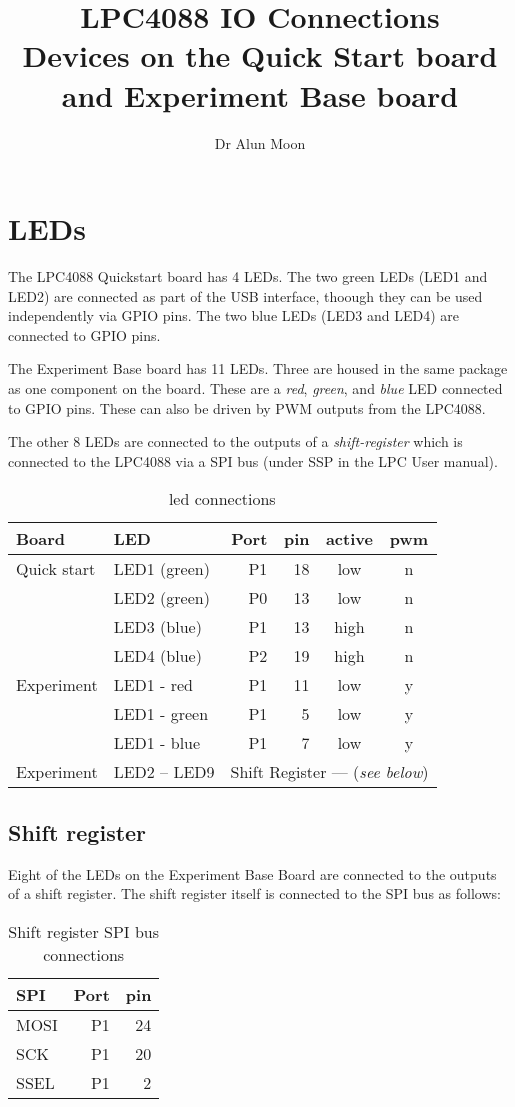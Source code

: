 \documentclass[12pt]{tufte-handout}
\title{LPC4088 IO Connections\\Devices on the Quick Start board and
  Experiment Base board}
\author{Dr Alun Moon}
\begin{document}
\maketitle

\section{LEDs}
The LPC4088 Quickstart board has 4 LEDs.  The two green LEDs (LED1 and
LED2) are connected as part of the USB interface, thoough they can be
used independently via GPIO pins.  The two blue LEDs (LED3 and LED4)
are connected to GPIO pins.

The Experiment Base board has 11 LEDs.  Three are housed in the same
package as one component on the board.  These are a \emph{red},
\emph{green}, and \emph{blue} LED connected to GPIO pins.  These can also
be driven by PWM outputs from the LPC4088.  

The other 8 LEDs are connected to the outputs of a
\emph{shift-register} which is connected to the LPC4088 via a SPI bus
(under SSP in the LPC User manual).
\begin{table}
\begin{tabular}{llrrcc}
  Board & LED & Port & pin & active & pwm \\
  \midrule[1pt]
  Quick start & {LED1} (green) & P1 & 18 & low  & n \\
              & {LED2} (green) & P0 & 13 & low & n \\
              & {LED3} (blue)  & P1 & 13 & high & n \\
              & {LED4} (blue)  & P2 & 19 & high & n \\
 \midrule
  Experiment  & {LED1 - red}   & P1 & 11 & low & y \\
              & {LED1 - green} & P1 &  5 & low & y \\
              & {LED1 - blue}  & P1 &  7 & low & y \\
 \midrule
   Experiment & {LED2} -- {LED9} & \multicolumn{4}{c}{Shift
  Register --- (\emph{see below})} \\ \bottomrule
\end{tabular}
\caption{{led} connections}
\label{tab:led-connections}
\end{table}
\subsection{Shift register}
Eight  of the {LED}s on the Experiment Base Board are connected
to the outputs of a shift register.  The shift register itself is
connected to the SPI bus as follows:
\begin{table}
\begin{tabular}{lrr}
  SPI & Port & pin \\ \midrule
  MOSI & P1 & 24 \\
  SCK & P1 & 20 \\
  SSEL & P1 & 2 \\ \bottomrule
\end{tabular}
\caption{Shift register SPI bus connections}
\label{tab:spishiftregister}
\end{table}


\end{document}
